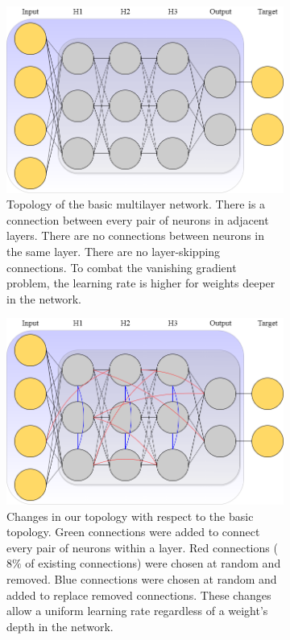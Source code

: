 \documentclass{article}
\begin{document}
\begin{figure}
  \centering
  \begin{subfigure}[t]{.48\textwidth}
    \includegraphics[width=.9\textwidth]{figures/scellier_network_default.png}
    \caption{Topology of the basic multilayer network. There is a connection between every pair of neurons in adjacent layers. There are no connections between neurons in the same layer. There are no layer-skipping connections. To combat the vanishing gradient problem, the learning rate is higher for weights deeper in the network.}
    \label{fig:top_basic}
  \end{subfigure}
  \hfill
  \begin{subfigure}[t]{.48\textwidth}
    \includegraphics[width=.9\textwidth]{figures/scellier_network_skconns.png}
    \caption{Changes in our topology with respect to the basic topology. Green connections were added to connect every pair of neurons within a layer. Red connections ($8\%$ of existing connections) were chosen at random and removed. Blue connections were chosen at random and added to replace removed connections. These changes allow a uniform learning rate regardless of a weight's depth in the network.}
    \label{fig:top_sw}
  \end{subfigure}
  \caption{}
  \label{fig:topology_illus}
\end{figure}
\end{document}
